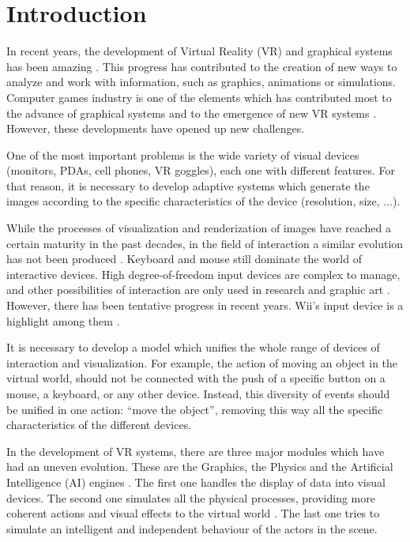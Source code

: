 \section{Introduction
\label{sec:introduction}}

In recent years, the development of Virtual Reality (VR) and graphical systems has been amazing \cite{Sherman2003}.
This progress has contributed to the creation of new ways to analyze and work with information, such
as graphics, animations or simulations. Computer games industry is one of the elements which has
contributed most to the advance of graphical systems and to the emergence of new VR systems \cite{Novak2007}.
However, these developments have opened up new challenges.

One of the most important problems is the wide variety of visual devices (monitors, PDAs, cell
phones, VR goggles), each one with different features. For that reason, it is necessary to develop
adaptive systems which generate the images according to the specific characteristics of the device
(resolution, size, ...).

While the processes of visualization and renderization of images have reached a certain maturity in
the past decades, in the field of interaction a similar evolution has not been produced
\cite{Joshua2004,David2005}. Keyboard and mouse still dominate the world of interactive devices.
High degree-of-freedom input devices are complex to manage, and other possibilities of interaction
are only used in research and graphic art \cite{Joshua2004}. However, there has been tentative
progress in recent years. Wii's input device is a highlight among them \cite{wiiNintendo}.

It is necessary to develop a model which unifies the whole range of devices of interaction and
visualization. For example, the action of moving an object in the virtual world, should not be
connected with the push of a specific button on a mouse, a keyboard, or any other device. Instead,
this diversity of events should be unified in one action: ``move the object'', removing this way
all the specific characteristics of the different devices.

In the development of VR systems, there are three major modules which have had an uneven evolution.
These are the Graphics, the Physics and the Artificial Intelligence (AI) engines \cite{Burdea2003}.
The first one handles the display of data into visual devices. The second one simulates all the
physical processes, providing more coherent actions and visual effects to the virtual world \cite{Wikipedia2007}.
The last one tries to simulate an intelligent and independent behaviour of the actors in the scene.

